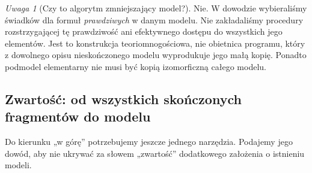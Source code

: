 \documentclass[11pt,a4paper]{article}
\numberwithin{equation}{section}
\theoremstyle{plain}
\theoremstyle{definition}
\theoremstyle{remark}
\newtheorem{uwaga}[twierdzenie]{Uwaga}
\begin{document}
\begin{uwaga}[Czy to algorytm zmniejszający model?]\label{res:14:6}
Nie. W dowodzie wybieraliśmy świadków dla formuł \emph{prawdziwych} w danym modelu. Nie zakładaliśmy procedury rozstrzygającej tę prawdziwość ani efektywnego dostępu do wszystkich jego elementów. Jest to konstrukcja teoriomnogościowa, nie obietnica programu, który z dowolnego opisu nieskończonego modelu wyprodukuje jego małą kopię. Ponadto podmodel elementarny nie musi być kopią izomorficzną całego modelu.
\end{uwaga}

\subsection*{Zwartość: od wszystkich skończonych fragmentów do modelu}\label{sec:14:3}
Do kierunku „w górę” potrzebujemy jeszcze jednego narzędzia. Podajemy jego dowód, aby nie ukrywać za słowem „zwartość” dodatkowego założenia o istnieniu modeli.
\end{document}
